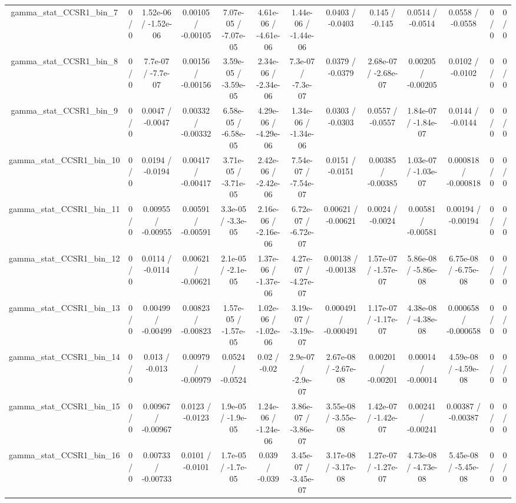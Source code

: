 \documentclass[10pt]{article}
\begin{document}
\begin{table}[htbp]
\begin{center}
\begin{tabular}{|c|c|c|c|c|c|c|c|c|c|c|c|c|}
  gamma_stat_CCSR1_bin_7 & 0 / 0 & 1.52e-06 / -1.52e-06 & 0.00105 / -0.00105 & 7.07e-05 / -7.07e-05 & 4.61e-06 / -4.61e-06 & 1.44e-06 / -1.44e-06 & 0.0403 / -0.0403 & 0.145 / -0.145 & 0.0514 / -0.0514 & 0.0558 / -0.0558 & 0 / 0 & 0 / 0 \\ 
  gamma_stat_CCSR1_bin_8 & 0 / 0 & 7.7e-07 / -7.7e-07 & 0.00156 / -0.00156 & 3.59e-05 / -3.59e-05 & 2.34e-06 / -2.34e-06 & 7.3e-07 / -7.3e-07 & 0.0379 / -0.0379 & 2.68e-07 / -2.68e-07 & 0.00205 / -0.00205 & 0.0102 / -0.0102 & 0 / 0 & 0 / 0 \\ 
  gamma_stat_CCSR1_bin_9 & 0 / 0 & 0.0047 / -0.0047 & 0.00332 / -0.00332 & 6.58e-05 / -6.58e-05 & 4.29e-06 / -4.29e-06 & 1.34e-06 / -1.34e-06 & 0.0303 / -0.0303 & 0.0557 / -0.0557 & 1.84e-07 / -1.84e-07 & 0.0144 / -0.0144 & 0 / 0 & 0 / 0 \\ 
  gamma_stat_CCSR1_bin_10 & 0 / 0 & 0.0194 / -0.0194 & 0.00417 / -0.00417 & 3.71e-05 / -3.71e-05 & 2.42e-06 / -2.42e-06 & 7.54e-07 / -7.54e-07 & 0.0151 / -0.0151 & 0.00385 / -0.00385 & 1.03e-07 / -1.03e-07 & 0.000818 / -0.000818 & 0 / 0 & 0 / 0 \\ 
  gamma_stat_CCSR1_bin_11 & 0 / 0 & 0.00955 / -0.00955 & 0.00591 / -0.00591 & 3.3e-05 / -3.3e-05 & 2.16e-06 / -2.16e-06 & 6.72e-07 / -6.72e-07 & 0.00621 / -0.00621 & 0.0024 / -0.0024 & 0.00581 / -0.00581 & 0.00194 / -0.00194 & 0 / 0 & 0 / 0 \\ 
  gamma_stat_CCSR1_bin_12 & 0 / 0 & 0.0114 / -0.0114 & 0.00621 / -0.00621 & 2.1e-05 / -2.1e-05 & 1.37e-06 / -1.37e-06 & 4.27e-07 / -4.27e-07 & 0.00138 / -0.00138 & 1.57e-07 / -1.57e-07 & 5.86e-08 / -5.86e-08 & 6.75e-08 / -6.75e-08 & 0 / 0 & 0 / 0 \\ 
  gamma_stat_CCSR1_bin_13 & 0 / 0 & 0.00499 / -0.00499 & 0.00823 / -0.00823 & 1.57e-05 / -1.57e-05 & 1.02e-06 / -1.02e-06 & 3.19e-07 / -3.19e-07 & 0.000491 / -0.000491 & 1.17e-07 / -1.17e-07 & 4.38e-08 / -4.38e-08 & 0.000658 / -0.000658 & 0 / 0 & 0 / 0 \\ 
  gamma_stat_CCSR1_bin_14 & 0 / 0 & 0.013 / -0.013 & 0.00979 / -0.00979 & 0.0524 / -0.0524 & 0.02 / -0.02 & 2.9e-07 / -2.9e-07 & 2.67e-08 / -2.67e-08 & 0.00201 / -0.00201 & 0.00014 / -0.00014 & 4.59e-08 / -4.59e-08 & 0 / 0 & 0 / 0 \\ 
  gamma_stat_CCSR1_bin_15 & 0 / 0 & 0.00967 / -0.00967 & 0.0123 / -0.0123 & 1.9e-05 / -1.9e-05 & 1.24e-06 / -1.24e-06 & 3.86e-07 / -3.86e-07 & 3.55e-08 / -3.55e-08 & 1.42e-07 / -1.42e-07 & 0.00241 / -0.00241 & 0.00387 / -0.00387 & 0 / 0 & 0 / 0 \\ 
  gamma_stat_CCSR1_bin_16 & 0 / 0 & 0.00733 / -0.00733 & 0.0101 / -0.0101 & 1.7e-05 / -1.7e-05 & 0.039 / -0.039 & 3.45e-07 / -3.45e-07 & 3.17e-08 / -3.17e-08 & 1.27e-07 / -1.27e-07 & 4.73e-08 / -4.73e-08 & 5.45e-08 / -5.45e-08 & 0 / 0 & 0 / 0 \\ 

\end{tabular}
\end{center}
\end{table}
\end{document}
